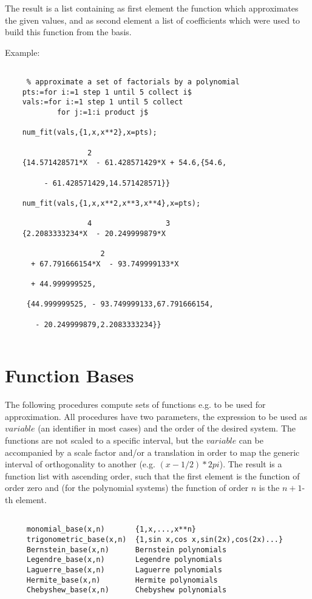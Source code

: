 The result is a list containing as first element the
function which approximates the given values, and as
second element a list of coefficients which were used
to build this function from the basis.
  
Example:

\begin{verbatim}
 
     % approximate a set of factorials by a polynomial
    pts:=for i:=1 step 1 until 5 collect i$
    vals:=for i:=1 step 1 until 5 collect
            for j:=1:i product j$

    num_fit(vals,{1,x,x**2},x=pts);
 
                   2
    {14.571428571*X  - 61.428571429*X + 54.6,{54.6,

         - 61.428571429,14.571428571}}

    num_fit(vals,{1,x,x**2,x**3,x**4},x=pts);

                   4                 3
    {2.2083333234*X  - 20.249999879*X

                      2
      + 67.791666154*X  - 93.749999133*X

      + 44.999999525,

     {44.999999525, - 93.749999133,67.791666154,

       - 20.249999879,2.2083333234}}


\end{verbatim}

\section{Function Bases}

The following procedures compute sets of functions
e.g. to be used for approximation.
All procedures have
two parameters, the expression to be used as $variable$
(an identifier in most cases) and the 
order of the desired system.
The functions are not scaled to a specific interval, but
the $variable$ can be accompanied by a scale factor 
and/or a translation
in order to map the generic interval of orthogonality to another
(e.g. $(x- 1/2 ) * 2 pi$).
The result is a function list with ascending order, such that
the first element is the function of order zero and (for
the polynomial systems) the function of order $n$ is the $n+1$-th
element.
 
\begin{verbatim}
 
     monomial_base(x,n)       {1,x,...,x**n}
     trigonometric_base(x,n)  {1,sin x,cos x,sin(2x),cos(2x)...}
     Bernstein_base(x,n)      Bernstein polynomials
     Legendre_base(x,n)       Legendre polynomials
     Laguerre_base(x,n)       Laguerre polynomials
     Hermite_base(x,n)        Hermite polynomials
     Chebyshew_base(x,n)      Chebyshew polynomials
 
\end{verbatim}

